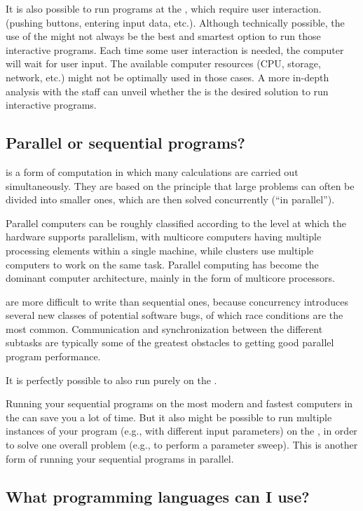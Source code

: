 It is also possible to run programs at the \hpc, which require user
interaction. (pushing buttons, entering input data, etc.).  Although
technically possible, the use of the \hpc might not always be the best and
smartest option to run those interactive programs.  Each time some user
interaction is needed, the computer will wait for user input. The available
computer resources (CPU, storage, network, etc.) might not be optimally used in
those cases. A more in-depth analysis with the \hpc staff can unveil whether
the \hpc is the desired solution to run interactive programs.

\subsection{Parallel or sequential programs?}
\label{sec:parallel-or-sequential-programs}

 is a form of computation in which many calculations
are carried out simultaneously. They are based on the principle that large
problems can often be divided into smaller ones, which are then solved
concurrently (``in parallel'').

Parallel computers can be roughly classified according to the level at which
the hardware supports parallelism, with multicore computers having multiple
processing elements within a single machine, while clusters use multiple
computers to work on the same task. Parallel computing has become the dominant
computer architecture, mainly in the form of multicore processors.

 are more difficult to write than sequential ones,
because concurrency introduces several new classes of potential software bugs,
of which race conditions are the most common. Communication and synchronization
between the different subtasks are typically some of the greatest obstacles to
getting good parallel program performance.

It is perfectly possible to also run purely  on the
\hpc.

Running your sequential programs on the most modern and fastest computers in
the \hpc can save you a lot of time.  But it also might be possible to run
multiple instances of your program (e.g., with different input parameters) on
the \hpc, in order to solve one overall problem (e.g., to perform a parameter
sweep). This is another form of running your sequential programs in parallel.

\subsection{What programming languages can I use?}
\label{sec:what-programming-languages-can-i-use}


